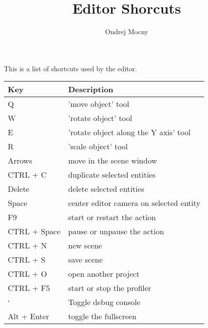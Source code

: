 \documentclass[a4paper, 12pt]{report}
\begin{document}
\pagestyle{empty} %

\title{Editor Shorcuts}
\author{Ondrej Mocny}

\pagestyle{plain} %

This is a list of shortcuts used by the editor.

\begin{tabular}{|p{0.20\hsize}|p{0.7\hsize}|}
  \hline
  Key & Description \\
	\hline
	Q & 'move object' tool \\
	W & 'rotate object' tool \\
	E & 'rotate object along the Y axis' tool \\
	R & 'scale object' tool \\
	\hline
	Arrows & move in the scene window \\
	CTRL + C & duplicate selected entities \\
	Delete & delete selected entities \\
	Space & center editor camera on selected entity \\
	F9 & start or restart the action \\
	CTRL + Space & pause or unpause the action \\
	\hline
	CTRL + N & new scene \\
	CTRL + S & save scene \\
	CTRL + O & open another project \\
	\hline
	CTRL + F5 & start or stop the profiler \\
	` & Toggle debug console \\
	Alt + Enter & toggle the fullscreen \\
	\hline
\end{tabular}
\end{document}

